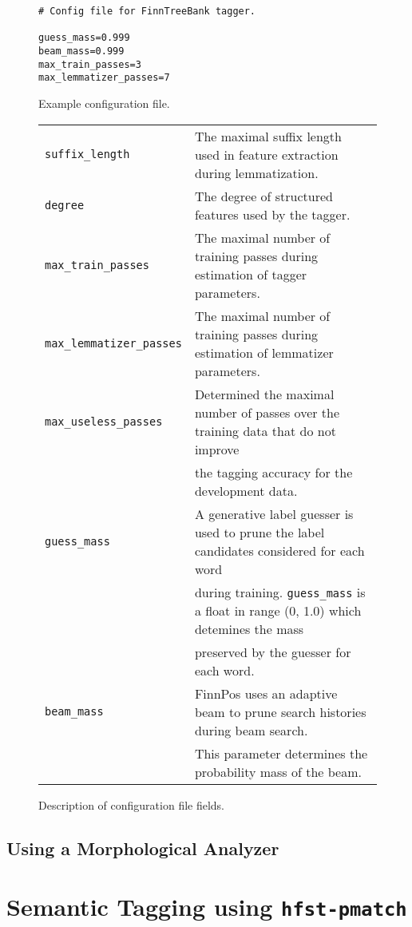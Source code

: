 \documentclass{llncs}
\begin{document}
\begin{figure}
\begin{verbatim}
# Config file for FinnTreeBank tagger.

guess_mass=0.999
beam_mass=0.999
max_train_passes=3
max_lemmatizer_passes=7
\end{verbatim}
\caption{Example configuration file.}
\end{figure}

\begin{figure}
\begin{tabular}{ll}
{\tt suffix\_length} & The maximal suffix length used in feature extraction during lemmatization.\\
{\tt degree} & The degree of structured features used by the tagger. \\
{\tt max\_train\_passes} & The maximal number of training passes during estimation of tagger parameters.\\
{\tt max\_lemmatizer\_passes} & The maximal number of training passes during estimation of lemmatizer parameters.\\
{\tt max\_useless\_passes} & Determined the maximal number of passes over the training data that do not improve\\
&  the tagging accuracy for the development data.\\
{\tt guess\_mass} & A generative label guesser is used to prune the label candidates considered for each word \\
                  & during training. {\tt guess\_mass} is a float in range (0, 1.0) which detemines the mass \\
                  &  preserved by the guesser for each word.\\
{\tt beam\_mass} & FinnPos uses an adaptive beam to prune search histories during beam search. \\
                 &  This parameter determines the probability mass of the beam.
\end{tabular}
\caption{Description of configuration file fields.}
\end{figure}

\subsection{Using a Morphological Analyzer}

\section{Semantic Tagging using {\tt hfst-pmatch}}\label{sec:sem-tagging}
\end{document}
